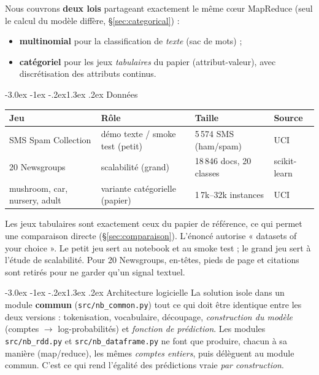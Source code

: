 \documentclass[11pt,a4paper]{article}
\makeatletter
\newcommand{\code}[1]{\lstinline[style=py]!#1!}
\renewcommand\subsection{\@startsection{subsection}{2}{\z@}%
  {-3.0ex \@plus -1ex \@minus -.2ex}{1.3ex \@plus.2ex}%
  {\normalfont\large\bfseries\color{primary!88!black}}}
\makeatother
\begin{document}
Nous couvrons \textbf{deux lois} partageant exactement le même cœur MapReduce (seul le calcul
du modèle diffère, \S\ref{sec:categorical}) :
\begin{itemize}
  \item \textbf{multinomial} pour la classification de \emph{texte} (sac de mots) ;
  \item \textbf{catégoriel} pour les jeux \emph{tabulaires} du papier (attribut-valeur),
        avec discrétisation des attributs continus.
\end{itemize}

\subsection{Données}
\begin{table}[H]
\centering\small
\begin{tabular}{@{}llll@{}}
\toprule
\textbf{Jeu} & \textbf{Rôle} & \textbf{Taille} & \textbf{Source} \\
\midrule
SMS Spam Collection & démo texte / smoke test (petit) & 5\,574 SMS (ham/spam) & UCI \\
20 Newsgroups & scalabilité (grand) & 18\,846 docs, 20 classes & scikit-learn \\
mushroom, car, nursery, adult & variante catégorielle (papier) & 1\,7k--32k instances & UCI \\
\bottomrule
\end{tabular}
\end{table}
Les jeux tabulaires sont exactement ceux du papier de référence, ce qui permet une
comparaison directe (\S\ref{sec:comparaison}). L'énoncé autorise « datasets of your choice ».
Le petit jeu sert au notebook et au smoke test ; le grand jeu sert à l'étude de scalabilité.
Pour 20 Newsgroups, en-têtes, pieds de page et citations sont retirés pour ne garder qu'un
signal textuel.

\subsection{Architecture logicielle}
La solution isole dans un module \textbf{commun} (\code{src/nb_common.py}) tout ce qui doit
être identique entre les deux versions : tokenisation, vocabulaire, découpage,
\emph{construction du modèle} (comptes $\to$ log-probabilités) et \emph{fonction de
prédiction}. Les modules \code{src/nb_rdd.py} et \code{src/nb_dataframe.py} ne font que
produire, chacun à sa manière (map/reduce), les mêmes \emph{comptes entiers}, puis délèguent
au module commun. C'est ce qui rend l'égalité des prédictions vraie \emph{par construction}.
\end{document}
